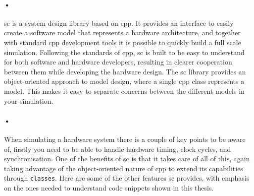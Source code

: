 \documentclass[a4paper, 12pt]{report}\dfrac{\right }{•}
\newcommand{\codeword}[1]{\texttt{#1}}
\begin{document}
\paragraph{•}
\gls{sc} is a system design library based on \gls{cpp}\cite{systemc}.
It provides an interface to easily create a software model that represents a hardware architecture, and together with standard \gls{cpp} development tools it is possible to quickly build a full scale simulation.
Following the standards of \gls{cpp}, \gls{sc} is built to be easy to understand for both software and hardware developers, resulting in clearer cooperation between them while developing the hardware design.
The \gls{sc} library provides an object-oriented approach to model design, where a single \gls{cpp} class represents a model.
This makes it easy to separate concerns between the different models in your simulation.

\paragraph{•}
When simulating a hardware system there is a couple of key points to be aware of, firstly you need to be able to handle hardware timing, clock cycles, and synchronisation.
One of the benefits of \gls{sc} is that it takes care of all of this, again taking advantage of the object-oriented nature of \gls{cpp} to extend its capabilities through \codeword{classes}.
Here are some of the other features \gls{sc} provides, with emphasis on the ones needed to understand code snippets shown in this thesis.
\end{document}
